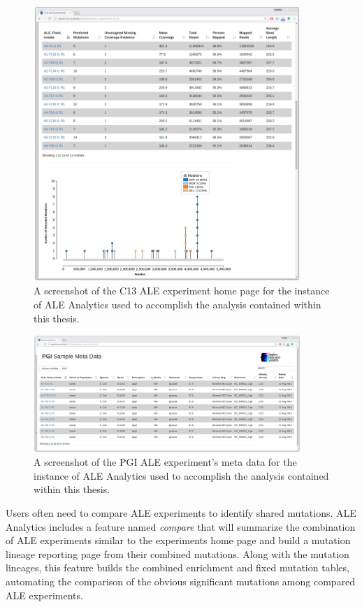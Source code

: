 \documentclass[12pt,final,masters,chapterheads]{ucsd}  %
\begin{document}
\begin{figure}[H]
  \centering
  \includegraphics[width=0.9\textwidth]{experiment_stats_page.png}
  \caption{A screenshot of the C13 ALE experiment home page for the instance of ALE Analytics used to accomplish the analysis contained within this thesis.}
  \label{fig:experiment_stats_page}
\end{figure}
\begin{figure}[H]
  \centering
  \includegraphics[width=0.9\textwidth]{metadata_page.png}
  \caption{A screenshot of the PGI ALE experiment's meta data for the instance of ALE Analytics used to accomplish the analysis contained within this thesis.}
  \label{fig:metadata_page}
\end{figure}
Users often need to compare ALE experiments to identify shared mutations. ALE Analytics includes a feature named \textit{compare} that will summarize the combination of ALE experiments similar to the experiments home page and build a mutation lineage reporting page from their combined mutations. Along with the mutation lineages, this feature builds the combined enrichment and fixed mutation tables, automating the comparison of the obvious significant mutations among compared ALE experiments.
\end{document}
